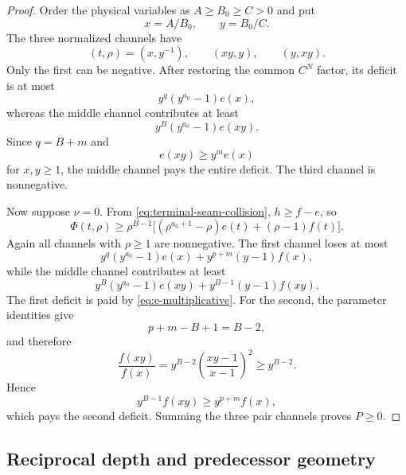 \documentclass[11pt]{article}
\theoremstyle{definition}
\begin{document}
\begin{proof}
Order the physical variables as \(A\ge B_0\ge C>0\) and put
\begin{equation*}
x=A/B_0,
\qquad y=B_0/C.
\end{equation*}
The three normalized channels have
\begin{equation*}
(t,\rho)=(x,y^{-1}),\qquad(xy,y),\qquad(y,xy).
\end{equation*}
Only the first can be negative.  After restoring the common \(C^N\) factor, its deficit is at most
\begin{equation*}
y^q(y^{a_0}-1)e(x),
\end{equation*}
whereas the middle channel contributes at least
\begin{equation*}
y^B(y^{a_0}-1)e(xy).
\end{equation*}
Since \(q=B+m\) and
\begin{equation}\label{eq:e-multiplicative}
e(xy)\ge y^m e(x)
\end{equation}
for \(x,y\ge1\), the middle channel pays the entire deficit.  The third channel is nonnegative.

Now suppose \(\nu=0\).  From \eqref{eq:terminal-seam-collision}, \(h\ge f-e\), so
\begin{equation*}
\Phi(t,\rho)
\ge
\rho^{B-1}
\bigl[(\rho^{a_0+1}-\rho)e(t)+(\rho-1)f(t)\bigr].
\end{equation*}
Again all channels with \(\rho\ge1\) are nonnegative.  The first channel loses at most
\begin{equation*}
y^q(y^{a_0}-1)e(x)
+y^{p+m}(y-1)f(x),
\end{equation*}
while the middle channel contributes at least
\begin{equation*}
y^B(y^{a_0}-1)e(xy)
+y^{B-1}(y-1)f(xy).
\end{equation*}
The first deficit is paid by \eqref{eq:e-multiplicative}.  For the second, the parameter identities give
\begin{equation*}
p+m-B+1=B-2,
\end{equation*}
and therefore
\begin{equation*}
\frac{f(xy)}{f(x)}
 =y^{B-2}
 \left(\frac{xy-1}{x-1}\right)^2
 \ge y^{B-2}.
\end{equation*}
Hence
\begin{equation*}
y^{B-1}f(xy)\ge y^{p+m}f(x),
\end{equation*}
which pays the second deficit.  Summing the three pair channels proves \(P\ge0\).
\end{proof}

\subsection{Reciprocal depth and predecessor geometry}
\end{document}

